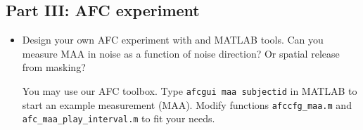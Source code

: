 \documentclass[11pt,a4paper,twoside]{article}
\begin{document}
\subsection*{Part III: AFC experiment}
\begin{itemize}

\item Design your own AFC experiment with \tascar{} and \tascar{}
  MATLAB tools. Can you measure MAA in noise as a function of noise
  direction? Or spatial release from masking?

  You may use our AFC toolbox. Type \verb!afcgui maa subjectid! in
  MATLAB to start an example measurement (MAA).  Modify functions
  \verb!afccfg_maa.m! and \verb!afc_maa_play_interval.m! to fit your
  needs.

\end{itemize}

\fi
\end{document}
